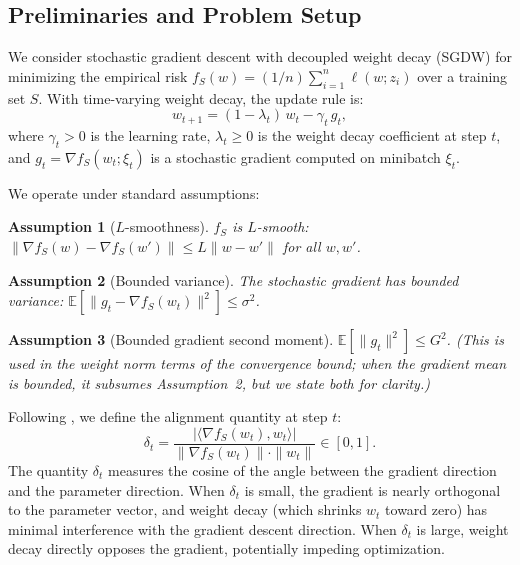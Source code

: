 \documentclass{article}
\newtheorem{assumption}{Assumption}
\begin{document}
\subsection{Preliminaries and Problem Setup}
\label{sec:prelim}

We consider stochastic gradient descent with decoupled weight decay (SGDW) for
minimizing the empirical risk
$f_S(w) = (1/n)\sum_{i=1}^{n} \ell(w; z_i)$ over a training set $S$.
With time-varying weight decay, the update rule is:
\begin{equation}
  w_{t+1} = (1 - \lambda_t)\, w_t - \gamma_t\, g_t,
  \label{eq:sgdw}
\end{equation}
where $\gamma_t > 0$ is the learning rate, $\lambda_t \geq 0$ is the weight decay
coefficient at step $t$, and $g_t = \nabla f_S(w_t; \xi_t)$ is a stochastic gradient
computed on minibatch $\xi_t$.

We operate under standard assumptions:
\begin{assumption}[$L$-smoothness]
  $f_S$ is $L$-smooth:
  $\|\nabla f_S(w) - \nabla f_S(w')\| \leq L\|w - w'\|$ for all $w, w'$.
\end{assumption}
\begin{assumption}[Bounded variance]
  The stochastic gradient has bounded variance:
  $\mathbb{E}[\|g_t - \nabla f_S(w_t)\|^2] \leq \sigma^2$.
\end{assumption}
\begin{assumption}[Bounded gradient second moment]
  $\mathbb{E}[\|g_t\|^2] \leq G^2$.
  (This is used in the weight norm terms of the convergence bound; when the gradient
  mean is bounded, it subsumes Assumption~2, but we state both for clarity.)
\end{assumption}

Following \citet{xie2024investigating}, we define the alignment quantity at step $t$:
\begin{equation}
  \delta_t = \frac{|\langle \nabla f_S(w_t), w_t \rangle|}
                  {\|\nabla f_S(w_t)\| \cdot \|w_t\|} \in [0, 1].
  \label{eq:alignment}
\end{equation}
The quantity $\delta_t$ measures the cosine of the angle between the gradient
direction and the parameter direction.
When $\delta_t$ is small, the gradient is nearly orthogonal to the parameter vector,
and weight decay (which shrinks $w_t$ toward zero) has minimal interference with the
gradient descent direction.
When $\delta_t$ is large, weight decay directly opposes the gradient, potentially
impeding optimization.
\end{document}
